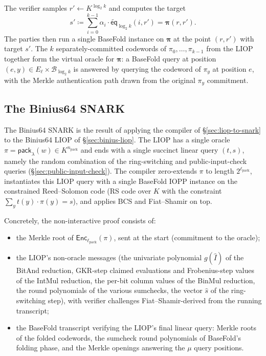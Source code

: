 \documentclass{article}
\theoremstyle{definition}
\newcommand*{\mle}{\widetilde}
\newcommand{\eq}{\mathsf{eq}}
\newcommand{\BB}{\mathcal{B}}
\begin{document}
The verifier samples $r' \gets K^{\log_2 k}$ and computes the target
\[
  s' \coloneqq \sum_{i = 0}^{k - 1} \alpha_i \cdot \mle{\eq}_{\log_2 k}(i, r') = \boldsymbol{\pi}(r, r').
\]
The parties then run a single BaseFold instance on $\boldsymbol{\pi}$ at the point $(r, r')$ with target $s'$. The $k$ separately-committed codewords of $\pi_0, \ldots, \pi_{k - 1}$ from the LIOP together form the virtual oracle for $\boldsymbol{\pi}$: a BaseFold query at position $(e, y) \in E_{\boldsymbol{\ell}} \times \BB_{\log_2 k}$ is answered by querying the codeword of $\pi_y$ at position $e$, with the Merkle authentication path drawn from the original $\pi_y$ commitment.

\subsection{The Binius64 SNARK}
\label{sec:binius64-snark}

The Binius64 SNARK is the result of applying the compiler of \S\ref{sec:liop-to-snark} to the Binius64 LIOP of \S\ref{sec:binius-liop}. The LIOP has a single oracle $\pi = \textsf{pack}_\lambda(w) \in K^{n_\text{pack}}$ and ends with a single succinct linear query $(t, s)$, namely the random combination of the ring-switching and public-input-check queries (\S\ref{sec:public-input-check}). The compiler zero-extends $\pi$ to length $2^{\ell_\text{pack}}$, instantiates this LIOP query with a single BaseFold IOPP instance on the constrained Reed--Solomon code (RS code over $K$ with the constraint $\sum_{y} t(y) \cdot \pi(y) = s$), and applies BCS and Fiat--Shamir on top.

Concretely, the non-interactive proof consists of:
\begin{itemize}
\item the Merkle root of $\textsf{Enc}_{\ell_\text{pack}}(\pi)$, sent at the start (commitment to the oracle);
\item the LIOP's non-oracle messages (the univariate polynomial $g(\widehat{I})$ of the BitAnd reduction, GKR-step claimed evaluations and Frobenius-step values of the IntMul reduction, the per-bit column values of the BinMul reduction, the round polynomials of the various sumchecks, the vector $\hat{s}$ of the ring-switching step), with verifier challenges Fiat--Shamir-derived from the running transcript;
\item the BaseFold transcript verifying the LIOP's final linear query: Merkle roots of the folded codewords, the sumcheck round polynomials of BaseFold's folding phase, and the Merkle openings answering the $\mu$ query positions.
\end{itemize}
\end{document}
